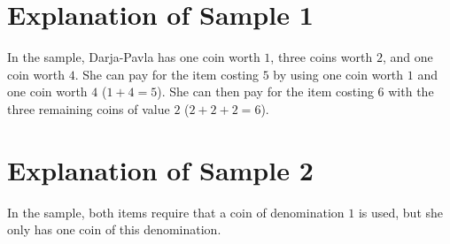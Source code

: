 \section*{Explanation of Sample 1}
In the sample, Darja-Pavla has one coin worth $1$, three coins worth $2$, and one coin worth $4$.
She can pay for the item costing $5$ by using one coin worth $1$ and one coin worth $4$ ($1 + 4 = 5$).
She can then pay for the item costing $6$ with the three remaining coins of value $2$ ($2 + 2 + 2 = 6$).

\section*{Explanation of Sample 2}
In the sample, both items require that a coin of denomination $1$ is used, but she only has one coin of this denomination.
